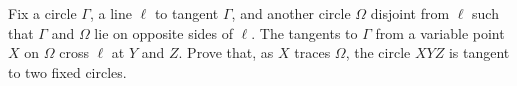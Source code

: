 Fix a circle $\Gamma$, a line $\ell$ to tangent $\Gamma$, and another circle $\Omega$ disjoint from $\ell$ such that $\Gamma$ and $\Omega$ lie on opposite sides of $\ell$. The tangents to $\Gamma$ from a variable point $X$ on $\Omega$ cross $\ell$ at $Y$ and $Z$. Prove that, as $X$ traces $\Omega$, the circle $XYZ$ is tangent to two fixed circles.